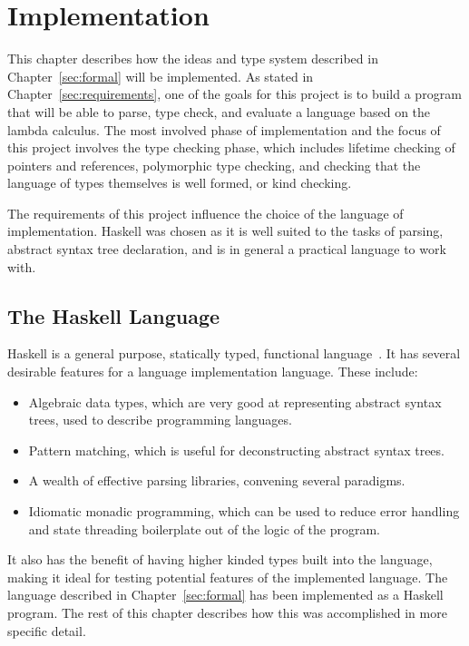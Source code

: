 \chapter{Implementation}\label{sec:impl}
This chapter describes how the ideas and type system described in
Chapter~\ref{sec:formal} will be implemented. As stated in
Chapter~\ref{sec:requirements}, one of the goals for this project is to build a
program that will be able to parse, type check, and evaluate a language based
on the lambda calculus. The most involved phase of implementation and the focus
of this project involves the type checking phase, which includes lifetime
checking of pointers and references, polymorphic type checking, and checking
that the language of types themselves is well formed, or kind checking.

The requirements of this project influence the choice of the language of
implementation. Haskell was chosen as it is well suited to the tasks of
parsing, abstract syntax tree declaration, and is in general a practical
language to work with.

\section{The Haskell Language}
Haskell is a general purpose, statically typed, functional
language~\cite{haskell}. It has several desirable features for a language
implementation language. These include:

\begin{itemize}
    \item Algebraic data types, which are very good at representing abstract syntax
    trees, used to describe programming languages.
    \item Pattern matching, which is useful for deconstructing abstract syntax trees.
    \item A wealth of effective parsing libraries, convening several paradigms.
    \item Idiomatic monadic programming, which can be used to reduce error handling
    and state threading boilerplate out of the logic of the program.
\end{itemize}

It also has the benefit of having higher kinded types built into the language,
making it ideal for testing potential features of the implemented language.
The language described in Chapter~\ref{sec:formal} has been implemented as a
Haskell program. The rest of this chapter describes how this was accomplished
in more specific detail.

